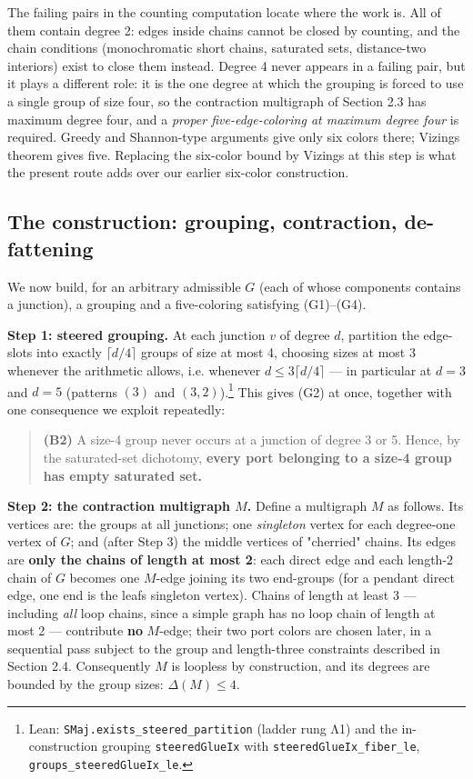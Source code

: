 \documentclass[11pt]{article}
\theoremstyle{definition}
\theoremstyle{remark}
\begin{document}
The failing pairs in the counting computation locate where the work is. All of them contain degree 2: edges inside chains cannot be closed by counting, and the chain conditions (monochromatic short chains, saturated sets, distance-two interiors) exist to close them instead. Degree 4 never appears in a failing pair, but it plays a different role: it is the one degree at which the grouping is forced to use a single group of size four, so the contraction multigraph of Section 2.3 has maximum degree four, and a \emph{proper five-edge-coloring at maximum degree four} is required. Greedy and Shannon-type arguments give only six colors there; Vizing\textquotesingle s theorem gives five. Replacing the six-color bound by Vizing\textquotesingle s at this step is what the present route adds over our earlier six-color construction.

\subsection{The construction: grouping, contraction, de-fattening}\label{23-the-construction-grouping-contraction-de-fattening}

We now build, for an arbitrary admissible \(G\) (each of whose components contains a junction), a grouping and a five-coloring satisfying (G1)--(G4).

\textbf{Step 1: steered grouping.} At each junction \(v\) of degree \(d\), partition the edge-slots into exactly \(\lceil d/4 \rceil\) groups of size at most 4, choosing sizes at most 3 whenever the arithmetic allows, i.e. whenever \(d \le 3\lceil d/4 \rceil\) --- in particular at \(d = 3\) and \(d = 5\) (patterns \((3)\) and \((3,2)\)).\footnote{Lean: \texttt{SMaj.exists\_steered\_partition} (ladder rung Λ1) and the in-construction grouping \texttt{steeredGlueIx} with \texttt{steeredGlueIx\_fiber\_le}, \texttt{groups\_steeredGlueIx\_le}.} This gives (G2) at once, together with one consequence we exploit repeatedly:

\begin{quote}
\textbf{(B2)} A size-4 group never occurs at a junction of degree 3 or 5. Hence, by the saturated-set dichotomy, \textbf{every port belonging to a size-4 group has empty saturated set.}
\end{quote}

\textbf{Step 2: the contraction multigraph \(M\).} Define a multigraph \(M\) as follows. Its vertices are: the groups at all junctions; one \emph{singleton} vertex for each degree-one vertex of \(G\); and (after Step 3) the middle vertices of "cherried" chains. Its edges are \textbf{only the chains of length at most 2}: each direct edge and each length-2 chain of \(G\) becomes one \(M\)-edge joining its two end-groups (for a pendant direct edge, one end is the leaf\textquotesingle s singleton vertex). Chains of length at least 3 --- including \emph{all} loop chains, since a simple graph has no loop chain of length at most 2 --- contribute \textbf{no} \(M\)-edge; their two port colors are chosen later, in a sequential pass subject to the group and length-three constraints described in Section 2.4. Consequently \(M\) is loopless by construction, and its degrees are bounded by the group sizes: \(\Delta(M) \le 4\).
\end{document}
